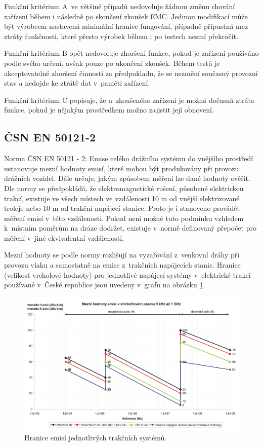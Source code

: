 Funkční kritérium A~ve většině případů nedovoluje žádnou změnu chování zařízení během i následně po skončení zkoušek EMC. Jedinou modifikací může být výrobcem nastavená minimální hranice fungování, případně přípustná mez ztráty funkčnosti, které přesto výrobek během i po testech nesmí překročit.

Funkční kritérium B opět nedovoluje zhoršení funkce, pokud je zařízení používáno podle svého určení, avšak pouze po ukončení zkoušek. Během testů je akceptovatelné zhoršení činnosti za předpokladu, že se nezmění současný provozní stav a nedojde ke ztrátě dat v~paměti zařízení.

Funkční kritérium C popisuje, že u~zkoušeného zařízení je možná dočasná ztráta funkce, pokud je nějakým prostředkem možno zajistit její obnovení.

\subsection{ČSN EN 50121-2}
Norma ČSN EN 50121 - 2: Emise celého drážního  systému do vnějšího prostředí ustanovuje mezní hodnoty emisí, které mohou být produkovány při provozu drážních vozidel. Dále určuje, jakým způsobem měření lze dané hodnoty ověřit. Dle normy se předpokládá, že elektromagnetické rušení, působené elektrickou trakcí, existuje ve všech místech ve vzdálenosti 10 m od vnější elektrizované troleje nebo 10 m od trakční napájecí stanice. Proto je i stanoveno provádět měření emisí v~této vzdálenosti. Pokud není možné tuto podmínku vzhledem k~místním poměrům na dráze dodržet, existuje v~normě definovaný přepočet pro měření v~jiné ekvivalentní vzdálenosti. 

Mezní hodnoty se podle normy rozlišují na vyzařování z~venkovní dráhy při provozu vlaku a samostatně na emise z~trakčních napájecích stanic. Hranice (velikost vrcholové hodnoty) pro jednotlivé napájecí systémy v~elektrické trakci používané v~České republice jsou uvedeny v~grafu na obrázku \ref{obr:emc_emise}.

\begin{figure}[!h]
	\centering
	\includegraphics[width=12cm]{emc_emise2.png}
	\caption{Hranice emisí jednotlivých trakčních systémů.}
	\label{obr:emc_emise}
\end{figure}


